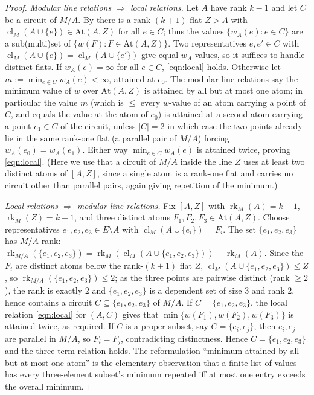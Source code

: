 \documentclass{article}
\theoremstyle{definition}
\newcommand{\rk}{\operatorname{rk}}
\newcommand{\cl}{\operatorname{cl}}
\begin{document}
\begin{proof}
\emph{Modular line relations $\Rightarrow$ local relations.} Let $A$ have rank $k-1$ and let $C$ be a
circuit of $M/A$. By  there is a rank-$(k+1)$ flat $Z>A$ with
$\cl_M(A\cup\{e\})\in\mathrm{At}(A,Z)$ for all $e\in C$; thus the values $\{w_A(e):e\in C\}$ are a
sub(multi)set of $\{w(F):F\in\mathrm{At}(A,Z)\}$. Two representatives $e,e'\in C$ with
$\cl_M(A\cup\{e\})=\cl_M(A\cup\{e'\})$ give equal $w_A$-values, so it suffices to handle distinct
flats. If $w_A(e)=\infty$ for all $e\in C$, \eqref{eqn:local} holds. Otherwise let
$m:=\min_{e\in C}w_A(e)<\infty$, attained at $e_0$. The modular line relations say the minimum value
of $w$ over $\mathrm{At}(A,Z)$ is attained by all but at most one atom; in particular the value $m$
(which is $\le$ every $w$-value of an atom carrying a point of $C$, and equals the value at the atom
of $e_0$) is attained at a second atom carrying a point $e_1\in C$ of the circuit, unless $|C|=2$ in
which case the two points already lie in the same rank-one flat (a parallel pair of $M/A$) forcing
$w_A(e_0)=w_A(e_1)$. Either way $\min_{e\in C}w_A(e)$ is attained twice, proving \eqref{eqn:local}.
(Here we use that a circuit of $M/A$ inside the line $Z$ uses at least two distinct atoms of
$[A,Z]$, since a single atom is a rank-one flat and carries no circuit other than parallel pairs,
again giving repetition of the minimum.)

\smallskip
\noindent\emph{Local relations $\Rightarrow$ modular line relations.} Fix $[A,Z]$ with $\rk_M(A)=k-1$,
$\rk_M(Z)=k+1$, and three distinct atoms $F_1,F_2,F_3\in\mathrm{At}(A,Z)$. Choose representatives
$e_1,e_2,e_3\in E\setminus A$ with $\cl_M(A\cup\{e_i\})=F_i$. The set $\{e_1,e_2,e_3\}$ has
$M/A$-rank: $\rk_{M/A}(\{e_1,e_2,e_3\})=\rk_M(\cl_M(A\cup\{e_1,e_2,e_3\}))-\rk_M(A)$. Since the $F_i$
are distinct atoms below the rank-$(k+1)$ flat $Z$, $\cl_M(A\cup\{e_1,e_2,e_3\})\le Z$, so
$\rk_{M/A}(\{e_1,e_2,e_3\})\le 2$; as the three points are pairwise distinct (rank $\ge2$), the rank
is exactly $2$ and $\{e_1,e_2,e_3\}$ is a dependent set of size $3$ and rank $2$, hence contains a
circuit $C\subseteq\{e_1,e_2,e_3\}$ of $M/A$. If $C=\{e_1,e_2,e_3\}$, the local relation
\eqref{eqn:local} for $(A,C)$ gives that $\min\{w(F_1),w(F_2),w(F_3)\}$ is attained twice, as
required. If $C$ is a proper subset, say $C=\{e_i,e_j\}$, then $e_i,e_j$ are parallel in $M/A$, so
$F_i=F_j$, contradicting distinctness. Hence $C=\{e_1,e_2,e_3\}$ and the three-term relation holds.
The reformulation ``minimum attained by all but at most one atom'' is the elementary observation that
a finite list of values has every three-element subset's minimum repeated iff at most one entry
exceeds the overall minimum.
\end{proof}
\end{document}
